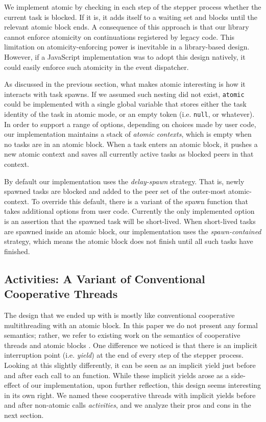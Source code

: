 \documentclass[acmsmall,anonymous,review]{acmart}\settopmatter{printfolios=true,printccs=false,printacmref=false}
\begin{document}
We implement atomic by checking in each step of the stepper process whether the current task is blocked.
If it is, it adds itself to a waiting set and blocks until the relevant atomic block ends.
A consequence of this approach is that our library cannot enforce atomicity on continuations registered by legacy code.
This limitation on atomicity-enforcing power is inevitable in a library-based design.
However, if a JavaScript implementation was to adopt this design natively, it could easily enforce such atomicity in the event dispatcher.

As discussed in the previous section, what makes atomic interesting is how it interacts with task spawns.
If we assumed such nesting did not exist, \texttt{atomic} could be implemented with a single global variable that stores either the task identity of the task in atomic mode, or an empty token (i.e. \texttt{null}, or whatever).
In order to support a range of options, depending on choices made by user code, our implementation maintains a stack of \emph{atomic contexts}, which is empty when no tasks are in an atomic block.
When a task enters an atomic block, it pushes a new atomic context and saves all currently active tasks as blocked peers in that context.

By default our implementation uses the \emph{delay-spawn} strategy.
That is, newly spawned tasks are blocked and added to the peer set of the outer-most atomic-context.
To override this default, there is a variant of the spawn function that takes additional options from user code.
Currently the only implemented option is an assertion that the spawned task will be short-lived.
When short-lived tasks are spawned inside an atomic block, our implementation uses the \emph{spawn-contained} strategy, which means the atomic block does not finish until all such tasks have finished.

\subsection{Activities: A Variant of Conventional Cooperative Threads}

The design that we ended up with is mostly like conventional cooperative multithreading with an atomic block.
In this paper we do not present any formal semantics; rather, we refer to existing work on the semantics of cooperative threads \cite{Abadi2009} and atomic blocks \cite{Moore2008}.
One difference we noticed is that there is an implicit interruption point (i.e. \emph{yield}) at the end of every step of the stepper process.
Looking at this slightly differently, it can be seen as an implicit yield just before and after each call to an \asyncs{} function.
While these implicit yields arose as a side-effect of our implementation, upon further reflection, this design seems interesting in its own right.
We named these cooperative threads with implicit yields before and after non-atomic calls \emph{activities}, and we analyze their pros and cons in the next section.
\end{document}
